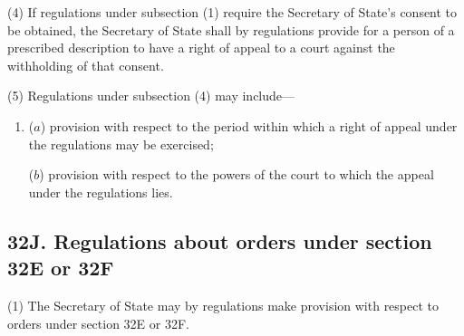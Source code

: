 \documentclass[12pt,a4paper]{article}
\begin{document}
(4) If regulations under subsection (1) require the Secretary of State’s consent to
be obtained, the Secretary of State shall by regulations provide for a person of a
prescribed description to have a right of appeal to a court against the withholding of
that consent.

(5) Regulations under subsection (4) may include---
\begin{enumerate}\item[]
($a$) provision with respect to the period within which a right of appeal under the
regulations may be exercised;

($b$) provision with respect to the powers of the court to which the appeal under
the regulations lies.
\end{enumerate}


\subsection{32J. Regulations about orders under section 32E or 32F}

(1) The Secretary of State may by regulations make provision with respect to orders under section 32E or 32F.
\end{document}
